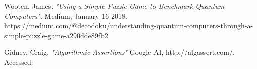 \documentclass[a4paper]{article}
\begin{document}
\begin{thebibliography}{9}
	Wooten, James. \emph{"Using a Simple Puzzle Game to Benchmark Quantum Computers".} Medium, January 16 2018. https://medium.com/@decodoku/understanding-quantum-computers-through-a-simple-puzzle-game-a290dde89fb2

\begin{comment}%

https://mybinder.org/v2/gh/decodoku/A_Game_to_Benchmark_Quantum_Computers/master?filepath=Play_Quantum_Awesomeness.ipynb
    Also seen below, using a python game to illustrate quantum noise

https://medium.com/@decodoku/quantum-computation-in-84-short-lines-d9c7c74be0d0
    https://medium.com/@decodoku
        https://mybinder.org/v2/gh/decodoku/A_Game_to_Benchmark_Quantum_Computers/master?filepath=Play_Quantum_Awesomeness.ipynb
            Also seen above
\end{comment}%

	Gidney, Craig. \emph{"Algorithmic Assertions"} Google AI, http://algassert.com/. Accessed: \date{\today}
\begin{comment} %
http://algassert.com/quantum/2014/03/07/Building-your-own-Quantum-Fourier-Transform.html
	http://algassert.com/post/1704
		circuit width talk
	http://algassert.com/post/1628
		swapping to teleporting with simple circuit moves
	http://algassert.com/post/1618
		Affecting atoms by looking at emitted light
	http://algassert.com/quantum/2015/05/01/Quantum-Network-Flow-Puzzle.html
\end{comment} %






\begin{comment} %


========Old Section=====


\end{comment}
\end{thebibliography}
\end{document}
